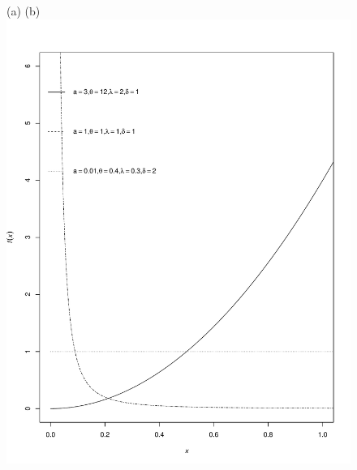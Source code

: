 \documentclass[12pt,a4paper]{article} %
\begin{document}
\begin{figure}[H]
\begin{center}
(a)\hspace{3.5cm} (b)\\
\includegraphics[scale=.3]{density.pdf}

\end{center}
\end{figure}
\end{document}
